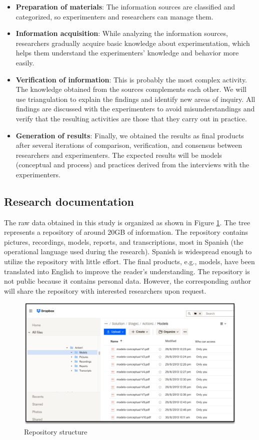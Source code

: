 \begin{itemize}
\item \textbf{Preparation of materials}: The information sources are classified and categorized, so experimenters and researchers can manage them.
\item \textbf{Information acquisition}: While analyzing the information sources, researchers gradually acquire basic knowledge about experimentation, which helps them understand the experimenters' knowledge and behavior more easily.
\item \textbf{Verification of information}: This is probably the most complex activity. The knowledge obtained from the sources complements each other. We will use triangulation to explain the findings and identify new areas of inquiry. All findings are discussed with the experimenters to avoid misunderstandings and verify that the resulting activities are those that they carry out in practice.
\item \textbf{Generation of results}: Finally, we obtained the results as final products after several iterations of comparison, verification, and consensus between researchers and experimenters. The expected results will be models (conceptual and process) and practices derived from the interviews with the experimenters.
\end{itemize}

\subsection{Research documentation}\label{sub-sec-research-documentaition}
The raw data obtained in this study is organized as shown in Figure \ref{fig-info-study}. The tree represents a repository of around 20GB of information. The repository contains pictures, recordings, models, reports, and transcriptions, most in Spanish (the operational language used during the research). Spanish is widespread enough to utilize the repository with little effort. The final products, e.g., models, have been translated into English to improve the reader's understanding. The repository is not public because it contains personal data. However, the corresponding author will share the repository with interested researchers upon request.

\begin{figure}[htbp!]
	\centering
	\includegraphics[width=\columnwidth]{images/Intermediate-Products}
	\caption{Repository structure}
	\label{fig-info-study}
\end{figure}
